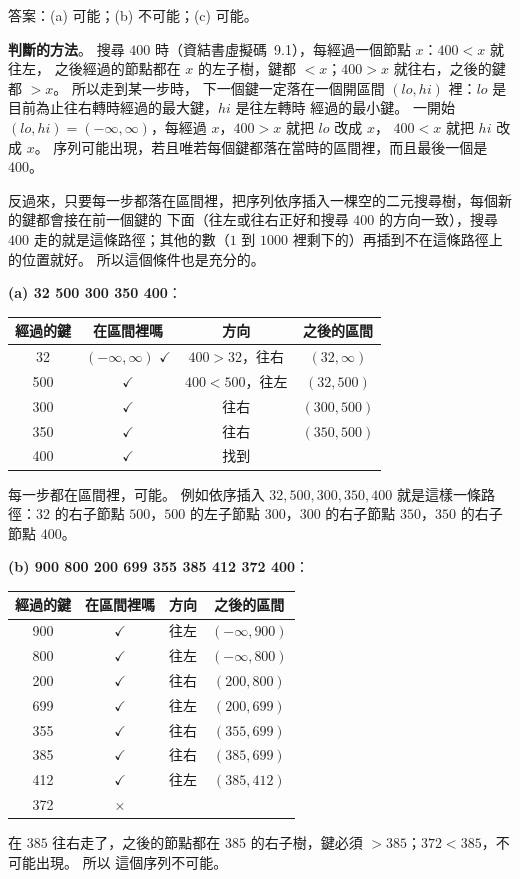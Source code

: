 \begin{pastsoln}
答案：(a) 可能；(b) 不可能；(c) 可能。

\textbf{判斷的方法}。 搜尋 $400$ 時（資結書虛擬碼~9.1），每經過一個節點 $x$：$400 < x$ 就往左，
之後經過的節點都在 $x$ 的左子樹，鍵都 $< x$；$400 > x$ 就往右，之後的鍵都 $> x$。 所以走到某一步時，
下一個鍵一定落在一個開區間 $(lo, hi)$ 裡：$lo$ 是目前為止往右轉時經過的最大鍵，$hi$ 是往左轉時
經過的最小鍵。 一開始 $(lo, hi) = (-\infty, \infty)$，每經過 $x$，$400 > x$ 就把 $lo$ 改成 $x$，
$400 < x$ 就把 $hi$ 改成 $x$。 序列可能出現，若且唯若每個鍵都落在當時的區間裡，而且最後一個是
$400$。

反過來，只要每一步都落在區間裡，把序列依序插入一棵空的二元搜尋樹，每個新的鍵都會接在前一個鍵的
下面（往左或往右正好和搜尋 $400$ 的方向一致），搜尋 $400$ 走的就是這條路徑；其他的數（$1$ 到
$1000$ 裡剩下的）再插到不在這條路徑上的位置就好。 所以這個條件也是充分的。

\textbf{(a) 32 500 300 350 400}：
\begin{center}
\small
\begin{tabular}{cccc}
\toprule
經過的鍵 & 在區間裡嗎 & 方向 & 之後的區間 \\
\midrule
32 & $(-\infty, \infty)$ $\checkmark$ & $400 > 32$，往右 & $(32, \infty)$ \\
500 & $\checkmark$ & $400 < 500$，往左 & $(32, 500)$ \\
300 & $\checkmark$ & 往右 & $(300, 500)$ \\
350 & $\checkmark$ & 往右 & $(350, 500)$ \\
400 & $\checkmark$ & 找到 & \\
\bottomrule
\end{tabular}
\end{center}
每一步都在區間裡，可能。 例如依序插入 $32, 500, 300, 350, 400$ 就是這樣一條路徑：$32$ 的右子節點
$500$，$500$ 的左子節點 $300$，$300$ 的右子節點 $350$，$350$ 的右子節點 $400$。

\textbf{(b) 900 800 200 699 355 385 412 372 400}：
\begin{center}
\small
\begin{tabular}{cccc}
\toprule
經過的鍵 & 在區間裡嗎 & 方向 & 之後的區間 \\
\midrule
900 & $\checkmark$ & 往左 & $(-\infty, 900)$ \\
800 & $\checkmark$ & 往左 & $(-\infty, 800)$ \\
200 & $\checkmark$ & 往右 & $(200, 800)$ \\
699 & $\checkmark$ & 往左 & $(200, 699)$ \\
355 & $\checkmark$ & 往右 & $(355, 699)$ \\
385 & $\checkmark$ & 往右 & $(385, 699)$ \\
412 & $\checkmark$ & 往左 & $(385, 412)$ \\
372 & $\times$ & & \\
\bottomrule
\end{tabular}
\end{center}
在 $385$ 往右走了，之後的節點都在 $385$ 的右子樹，鍵必須 $> 385$；$372 < 385$，不可能出現。 所以
這個序列不可能。


\end{pastsoln}
